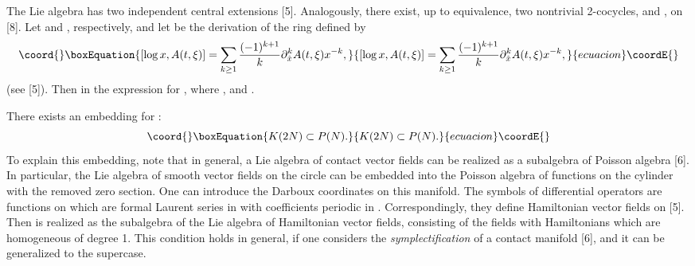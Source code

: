 \documentclass[a4paper,a4paper]{article}
\begin{document}
The Lie algebra \coordHE{}
has two independent central extensions [5].
Analogously, there exist, up to equivalence, two 
nontrivial 2-cocycles, \coordHE{} and \coordHE{},
on \coordHE{} [8].
Let \coordHE{} and \coordHE{}, respectively, and
let \coordHE{} be the derivation of the ring \coordHE{} defined by
\begin{equation}\coord{}\boxEquation{
[\log  x,A(t, \xi)] = \sum_{k\geq 1}
 \frac {(-1)^{k+1}}{k}\partial^k_{\hat{x}}A(t, \xi)x^{-k},
}{
[\log  x,A(t, \xi)] = \sum_{k\geq 1}
 \frac {(-1)^{k+1}}{k}\partial^k_{\hat{x}}A(t, \xi)x^{-k},
}{ecuacion}\coordE{}\end{equation}
(see [5]). Then
\coordHE{} in the expression for
\coordHE{}, where 
\coordHE{}, and \coordHE{}.

There exists an embedding for \coordHE{}:
\begin{equation}\coord{}\boxEquation{
K(2N) \subset P(N).
}{
K(2N) \subset P(N).
}{ecuacion}\coordE{}\end{equation}
To explain this embedding, note that
in general, a  Lie algebra of contact vector fields
can be realized as a
subalgebra of Poisson algebra [6]. 
In particular, the Lie algebra \coordHE{}
of smooth vector fields on the circle can be embedded
into the Poisson algebra of functions on 
the cylinder \coordHE{}
with the removed zero section.
One can  introduce 
the Darboux coordinates
\coordHE{} on this manifold.
The symbols of differential operators are functions on  \coordHE{}
which are formal Laurent series in \coordHE{} with coefficients
periodic in \coordHE{}. Correspondingly, 
they define Hamiltonian vector fields on \coordHE{} [5].
Then  \coordHE{} is realized as 
the subalgebra of the Lie algebra of
Hamiltonian vector fields, consisting of the fields  with Hamiltonians 
which are homogeneous of degree 1.
This condition holds in general, if one considers the
{\it symplectification} of a contact manifold [6], and
it can be generalized to the supercase.
\end{document}
